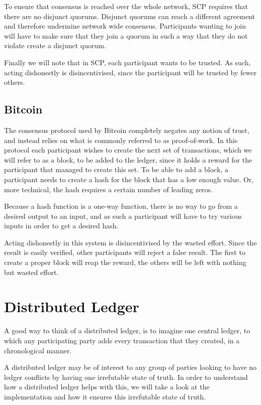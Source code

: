 \documentclass[12pt]{report}
\theoremstyle{plain}
\theoremstyle{definition}
\begin{document}
	To ensure that consensus is reached over the whole network, SCP requires that there are no disjunct quorums. Disjunct quorums can reach a different agreement and therefore undermine network wide consensus. Participants wanting to join will have to make sure that they join a quorum in such a way that they do not violate create a disjunct quorum.
	
	Finally we will note that in SCP, each participant wants to be trusted. As such, acting dishonestly is disincentivised, since the participant will be trusted by fewer others.\cite{stellarconsensus}
	\subsection{Bitcoin}
	The consensus protocol used by Bitcoin completely negates any notion of trust, and instead relies on what is commonly referred to as proof-of-work. In this protocol each participant wishes to create the next set of transactions, which we will refer to as a block, to be added to the ledger, since it holds a reward for the participant that managed to create this set. To be able to add a block, a participant needs to create a hash for the block that has a low enough value. Or, more technical, the hash requires a certain number of leading zeros.
	
	Because a hash function is a one-way function, there is no way to go from a desired output to an input, and as such a participant will have to try various inputs in order to get a desired hash.
	
	Acting dishonestly in this system is disincentivised by the wasted effort. Since the result is easily verified, other participants will reject a false result. The first to create a proper block will reap the reward, the others will be left with nothing but wasted effort.\cite{bitcoinconsensus}
	\section{Distributed Ledger}
	A good way to think of a distributed ledger, is to imagine one central ledger, to which any participating party adds every transaction that they created, in a chronological manner.
	
	A distributed ledger may be of interest to any group of parties looking to have no ledger conflicts by having one irrefutable state of truth. In order to understand how a distributed ledger helps with this, we will take a look at the implementation and how it ensures this irrefutable state of truth.
	
\end{document}

